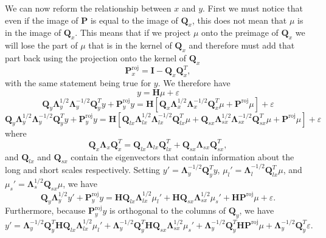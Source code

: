 \documentclass[11pt]{article} %
\newcommand{\mat}{\mathbf}
\begin{document}
We can now reform the relationship between $x$ and $y$.
First we must notice that even if the image of $\mat{P}$ is equal to
the image of $\mat{Q}_x$, this does not mean that $\mu$ is in the
image of $\mat{Q}_x$.
This means that if we project $\mu$ onto the preimage of $\mat{Q}_x$
we will lose the part of $\mu$ that is in the kernel of $\mat{Q}_x$
and therefore must add that part back using the projection onto the
kernel of $\mat{Q}_x$
\[
  \mat{P}^\text{roj}_x = \mat{I} - \mat{Q}_x \mat{Q}_x^T,
\]
with the same statement being true for $y$.
We therefore have
\[
  y = \mat{H} \mu + \varepsilon
\]
\[
  \mat{Q}_y \mat{\Lambda}_y^{1/2} \mat{\Lambda}_y^{-1/2} \mat{Q}_y^T y
  + \mat{P}^\text{roj}_y y
  = \mat{H}
  \left[
    \mat{Q}_x \mat{\Lambda}_x^{1/2} \mat{\Lambda}_x^{-1/2} \mat{Q}_x^T \mu
    + \mat{P}^\text{roj} \mu
  \right]
  + \varepsilon
\]
\[
  \mat{Q}_y \mat{\Lambda}_y^{1/2} \mat{\Lambda}_y^{-1/2} \mat{Q}_y^T y
  + \mat{P}^\text{roj}_y y
  = \mat{H}
  \left[
    \mat{Q}_{lx} \mat{\Lambda}_{lx}^{1/2} \mat{\Lambda}_{lx}^{-1/2}
    \mat{Q}_{lx}^T \mu
    + \mat{Q}_{sx} \mat{\Lambda}_{sx}^{1/2} \mat{\Lambda}_{sx}^{-1/2}
    \mat{Q}_{sx}^T \mu
    + \mat{P}^\text{roj} \mu
  \right]
  + \varepsilon
\]
where
\begin{equation}\label{eq:eig decomp decomp}
  \mat{Q}_x \mat{\Lambda}_x \mat{Q}_x^T
  = \mat{Q}_{lx} \mat{\Lambda}_{lx} \mat{Q}_{lx}^T
  + \mat{Q}_{sx} \mat{\Lambda}_{sx} \mat{Q}_{sx}^T,
\end{equation}
and $\mat{Q}_{lx}$ and $\mat{Q}_{sx}$ contain the eigenvectors that
contain information about the long and short scales
respectively.
Setting $y' = \mat{\Lambda}_y^{-1/2} \mat{Q}_y^T y$, $\mu_l' =
\mat{\Lambda}_l^{-1/2} \mat{Q}_{lx}^T \mu$, and $\mu_s' =
\mat{\Lambda}_s^{1/2} \mat{Q}_{sx} \mu$, we have
\[
  \mat{Q}_y \mat{\Lambda}_y^{1/2} y'
  + \mat{P}^\text{roj}_y y
  = \mat{H} \mat{Q}_{lx} \mat{\Lambda}_{lx}^{1/2} \mu_l'
  + \mat{H} \mat{Q}_{sx} \mat{\Lambda}_{sx}^{1/2} \mu_s'
  + \mat{H} \mat{P}^\text{roj} \mu
  + \varepsilon.
\]
Furthermore, because $\mat{P}^\text{roj}_y y$ is orthogonal to the
columns of $\mat{Q}_y$, we have
\begin{equation}\label{eq:prime decomp}
  y'
  = \mat{\Lambda}_y^{-1/2} \mat{Q}_y^T
  \mat{H} \mat{Q}_{lx} \mat{\Lambda}_{lx}^{1/2} \mu_l'
  + \mat{\Lambda}_y^{-1/2} \mat{Q}_y^T
  \mat{H} \mat{Q}_{sx} \mat{\Lambda}_{sx}^{1/2} \mu_s'
  + \mat{\Lambda}_y^{-1/2} \mat{Q}_y^T
  \mat{H} \mat{P}^\text{roj} \mu
  + \mat{\Lambda}_y^{-1/2} \mat{Q}_y^T \varepsilon.
\end{equation}
\end{document}
